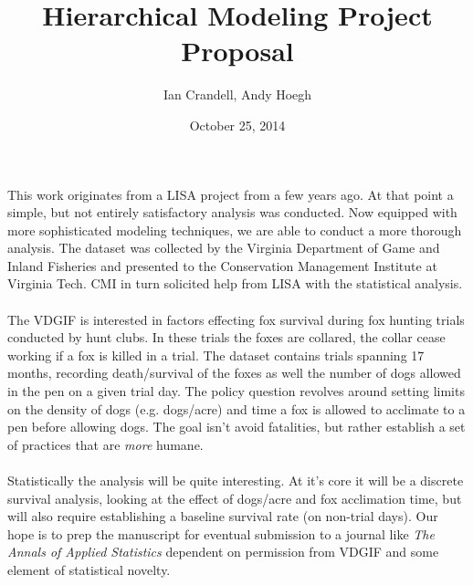 \documentclass[11pt]{article}
\date{October 25, 2014}
\author{Ian Crandell, Andy Hoegh}
\title{Hierarchical Modeling Project Proposal}
\begin{document}
\maketitle
\noindent
This work originates from a LISA project from a few years ago. At that point a simple, but not entirely satisfactory analysis was conducted. Now equipped with more sophisticated modeling techniques, we are able to conduct a more thorough analysis. The dataset was collected by the Virginia Department of Game and Inland Fisheries and presented to the Conservation Management Institute at Virginia Tech. CMI in turn solicited help from LISA with the statistical analysis.\\
\\
The VDGIF is interested in factors effecting fox survival during fox hunting trials conducted by hunt clubs. In these trials the foxes are collared, the collar cease working if a fox is killed in a trial. The dataset contains trials spanning 17 months, recording death/survival of the foxes as well the number of dogs allowed in the pen on a given trial day. The policy question revolves around setting limits on the density of dogs (e.g. dogs/acre) and time a fox is allowed to acclimate to a pen before allowing dogs. The goal isn't avoid fatalities, but rather establish a set of practices that are \emph{more} humane.\\
\\
Statistically the analysis will be quite interesting. At it's core it will be a discrete survival analysis, looking at the effect of dogs/acre and fox acclimation time, but will also require establishing a baseline survival rate (on non-trial days). Our hope is to prep the manuscript for eventual submission to a journal like \emph{The Annals of Applied Statistics} dependent on permission from VDGIF and some element of statistical novelty.
\end{document}
